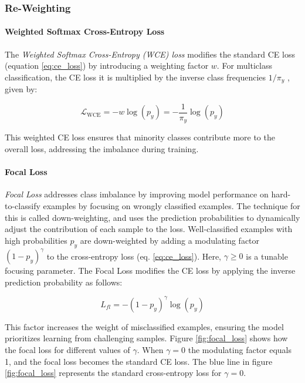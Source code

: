 \subsubsection{Re-Weighting}
\label{sec:re-weighting}
\paragraph{Weighted Softmax Cross-Entropy Loss}
The \emph{Weighted Softmax Cross-Entropy (WCE) loss} modifies the standard CE loss (equation \eqref{eq:ce_loss}) by introducing a weighting factor $w$. For multiclass classification, the CE loss it is multiplied by the inverse class frequencies $1/\pi_y$ \cite{zhang2023deep,lin2018focallossdenseobject}, given by:

\begin{equation}
    \label{eq:wce_loss}
    \mathcal{L}_{\text{WCE}} = -w \log(p_y) = - \frac{1}{\pi_y} \log(p_y)
\end{equation}

This weighted CE loss ensures that minority classes contribute more to the overall loss, addressing the imbalance during training.


\paragraph{Focal Loss}
\emph{Focal Loss} \cite{lin2018focallossdenseobject} addresses class imbalance by improving model performance on hard-to-classify examples by focusing on wrongly classified examples. The technique for this is called down-weighting, and uses the prediction probabilities to dynamically adjust the contribution of each sample to the loss. Well-classified examples with high probabilities $p_y$ are down-weighted by adding a modulating factor $(1 - p_y)^\gamma$ to the cross-entropy loss (eq. \eqref{eq:ce_loss}). Here, $\gamma \geq 0$ is a tunable focusing parameter. The Focal Loss modifies the CE loss by applying the inverse prediction probability as follows:

\begin{equation}
    \label{eq:focal_loss}
    L_{fl} = -(1 - p_y)^\gamma \log(p_y)
\end{equation}

This factor increases the weight of misclassified examples, ensuring the model prioritizes learning from challenging samples. Figure \ref{fig:focal_loss} shows how the focal loss for different values of $\gamma$. When $\gamma = 0$ the modulating factor equals 1, and the focal loss becomes the standard CE loss. The blue line in figure \ref{fig:focal_loss} represents the standard cross-entropy loss for $\gamma = 0$.

